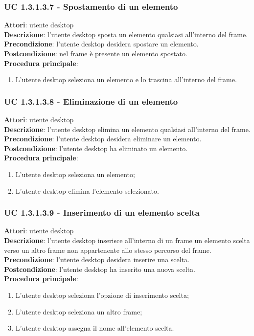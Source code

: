 \subsubsection{UC 1.3.1.3.7 - Spostamento di un elemento}{
	\label{uc1.3.1.3.7}
	\textbf{Attori}: utente desktop \\
	\textbf{Descrizione}: l'utente desktop sposta un elemento qualsiasi all'interno del frame. \\
	\textbf{Precondizione}: l'utente desktop desidera spostare un elemento.	\\
	\textbf{Postcondizione}: nel frame è presente un elemento spostato.	\\
	\textbf{Procedura principale}:
	\begin{enumerate}
		\item L'utente desktop seleziona un elemento e lo trascina all'interno del frame.
	\end{enumerate}
	}
\subsubsection{UC 1.3.1.3.8 - Eliminazione di un elemento}{
	\label{uc1.3.1.3.8}
	\textbf{Attori}: utente desktop \\
	\textbf{Descrizione}: l'utente desktop elimina un elemento qualsiasi all'interno del frame. \\
	\textbf{Precondizione}: l'utente desktop desidera eliminare un elemento.	\\
	\textbf{Postcondizione}: l'utente desktop ha eliminato un elemento.	\\
	\textbf{Procedura principale}:
	\begin{enumerate}
		\item L'utente desktop seleziona un elemento;
		\item L'utente desktop elimina l'elemento selezionato.
	\end{enumerate}
	}
\subsubsection{UC 1.3.1.3.9 - Inserimento di un elemento scelta}{
	\label{uc1.3.1.3.9}
	\textbf{Attori}: utente desktop \\
	\textbf{Descrizione}: l'utente desktop inserisce all'interno di un frame un elemento scelta verso un altro frame non appartenente allo stesso percorso del frame. \\
	\textbf{Precondizione}: l'utente desktop desidera inserire una scelta.	\\
	\textbf{Postcondizione}: l'utente desktop ha inserito una nuova scelta.	\\
	\textbf{Procedura principale}:
	\begin{enumerate}
		\item L'utente desktop seleziona l'opzione di inserimento scelta;
		\item L'utente desktop seleziona un altro frame;
		\item L'utente desktop assegna il nome all'elemento scelta.
	\end{enumerate}
	}

